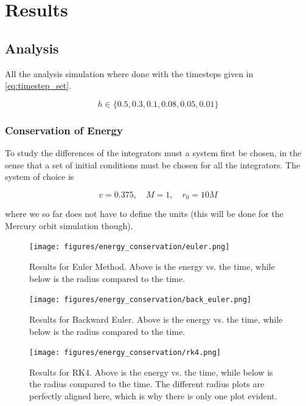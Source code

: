 \section{Results}\label{sec:results}

\subsection{Analysis}

All the analysis simulation where done with the timesteps given in \eqref{eq:timestep_set}. 

\begin{equation}\label{eq:timestep_set}
	h \in \{ 0.5, 0.3, 0.1, 0.08, 0.05, 0.01\}
\end{equation}

\subsubsection{Conservation of Energy}\label{sec:energy_conservation}

To study the differences of the integrators must a system first be chosen, in the sense that a set of initial conditions must be chosen for all the integrators. The system of choice is

\begin{equation}
	v = 0.375 , \quad M = 1, \quad r_0 = 10M
\end{equation}

where we so far does not have to define the units (this will be done for the Mercury orbit simulation though). 

\begin{figure}[ht!]
	\centering
	\texttt{[image: figures/energy\_conservation/euler.png]}
	\caption{Results for Euler Method. Above is the energy vs. the time, while below is the radius compared to the time. }
	\label{fig:euler_energy_cons}
\end{figure}
\begin{figure}[ht!]
	\centering
	\texttt{[image: figures/energy\_conservation/back\_euler.png]}
	\caption{Results for Backward Euler. Above is the energy vs. the time, while below is the radius compared to the time. }
	\label{fig:back_euler_energy_cons}
\end{figure}
\begin{figure}[ht!]
	\centering
	\texttt{[image: figures/energy\_conservation/rk4.png]}
	\caption{Results for RK4. Above is the energy vs. the time, while below is the radius compared to the time. The different radius plots are perfectly aligned here, which is why there is only one plot evident. }
	\label{fig:rk4_energy_cons}
\end{figure}

